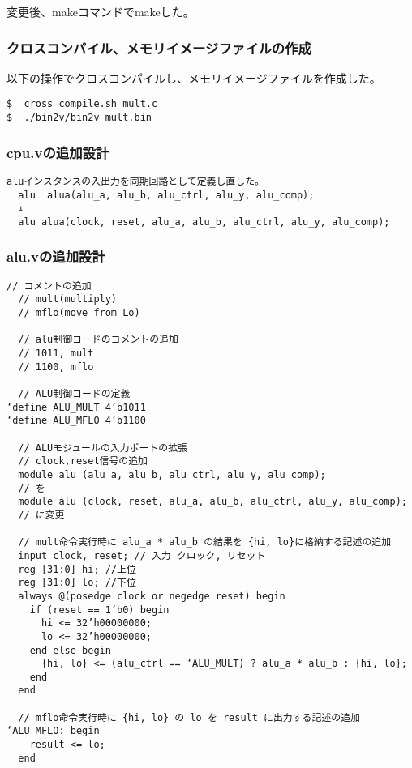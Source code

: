 変更後、makeコマンドでmakeした。

\subsubsection{クロスコンパイル、メモリイメージファイルの作成}
以下の操作でクロスコンパイルし、メモリイメージファイルを作成した。
\begin{lstlisting}[caption={クロスコンパイル、メモリイメージファイルの作成},label={クロスコンパイル、メモリイメージファイルの作成9}]
$  cross_compile.sh mult.c
$  ./bin2v/bin2v mult.bin
\end{lstlisting}

\subsubsection{cpu.vの追加設計}
\begin{lstlisting}[caption={cpu.vの変更},label={cpu.vの変更9}]
  aluインスタンスの入出力を同期回路として定義し直した。
  alu  alua(alu_a, alu_b, alu_ctrl, alu_y, alu_comp);
  ↓
  alu alua(clock, reset, alu_a, alu_b, alu_ctrl, alu_y, alu_comp);
\end{lstlisting}

\subsubsection{alu.vの追加設計}
\begin{lstlisting}[caption={alu.vの変更},label={alu.vの変更9}]
  // コメントの追加
  // mult(multiply)
  // mflo(move from Lo)
  
  // alu制御コードのコメントの追加
  // 1011, mult
  // 1100, mflo
  
  // ALU制御コードの定義
‘define ALU_MULT 4’b1011
‘define ALU_MFLO 4’b1100
  
  // ALUモジュールの入力ポートの拡張
  // clock,reset信号の追加
  module alu (alu_a, alu_b, alu_ctrl, alu_y, alu_comp);
  // を
  module alu (clock, reset, alu_a, alu_b, alu_ctrl, alu_y, alu_comp);
  // に変更
  
  // mult命令実行時に alu_a * alu_b の結果を {hi, lo}に格納する記述の追加
  input clock, reset; // 入力 クロック, リセット
  reg [31:0] hi; //上位
  reg [31:0] lo; //下位
  always @(posedge clock or negedge reset) begin
    if (reset == 1’b0) begin
      hi <= 32’h00000000;
      lo <= 32’h00000000;
    end else begin
      {hi, lo} <= (alu_ctrl == ‘ALU_MULT) ? alu_a * alu_b : {hi, lo};
    end
  end
  
  // mflo命令実行時に {hi, lo} の lo を result に出力する記述の追加
‘ALU_MFLO: begin
    result <= lo;
  end
  
\end{lstlisting}


